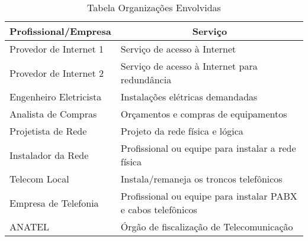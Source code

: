 \begin{table}[h!]
\centering
\caption{Tabela Organizações Envolvidas}
\label{tab1}
	\begin{tabular}{|l|l|}
		\hline
		\multicolumn{1}{|c|}{\textbf{Profissional/Empresa}} & \multicolumn{1}{c|}{\textbf{Serviço}}                         \\ \hline
		Provedor de Internet 1                              & Serviço de acesso à Internet                                  \\ \hline
		Provedor de Internet 2                              & Serviço de acesso à Internet para redundância                 \\ \hline
		Engenheiro Eletricista                              & Instalações elétricas demandadas                              \\ \hline
		Analista de Compras                                 & Orçamentos e compras de equipamentos                          \\ \hline
		Projetista de Rede                                  & Projeto da rede física e lógica                               \\ \hline
		Instalador da Rede                                  & Profissional ou equipe para instalar a rede física            \\ \hline
		Telecom Local                                       & Instala/remaneja os troncos telefônicos                       \\ \hline
		Empresa de Telefonia                                & Profissional ou equipe para instalar PABX e cabos telefônicos \\ \hline
		ANATEL                                              & Órgão de fiscalização de Telecomunicação                      \\ \hline
	\end{tabular}
\end{table}